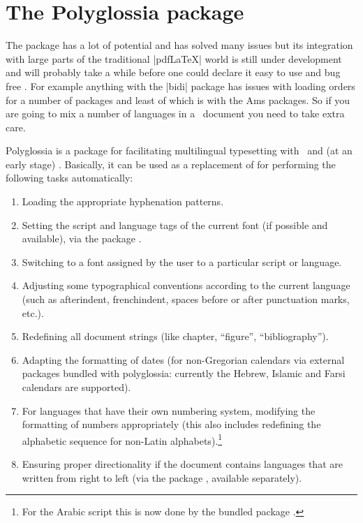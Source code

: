 

\section{The Polyglossia package}

The  package has a lot of potential and has solved many issues
but its integration with large parts of the traditional |pdfLaTeX| world
is still under development and will probably take a while before one could
declare it easy to use and bug free . For example anything with the |bidi| package has issues with loading orders for a number of packages and least of which is with
the Ams packages. So if you are going to mix a number of languages in a \XeTeX\ document
you need to take extra care.

 Polyglossia is a package for facilitating multilingual typesetting with
 \XeLaTeX\ and (at an early stage) \LuaLaTeX.  Basically, it
 can be used as a replacement of  for performing the following
 tasks automatically:
 
 \begin{enumerate}
 \item Loading the appropriate hyphenation patterns.
 \item Setting the script and language tags of the current font (if possible and
       available), via the package .
 \item Switching to a font assigned by the user to a particular script or language.
 \item Adjusting some typographical conventions according to the current language
       (such as afterindent, frenchindent, spaces before or after punctuation marks,
       etc.).
 \item Redefining all document strings (like chapter, ``figure'', ``bibliography'').
 \item Adapting the formatting of dates (for non-Gregorian calendars via external
       packages bundled with polyglossia: currently the Hebrew, Islamic and Farsi
       calendars are supported).
 \item For languages that have their own numbering system, modifying the formatting
       of numbers appropriately (this also includes redefining the alphabetic sequence
       for non-Latin alphabets).\footnote{ %
         For the Arabic script this is now done by the bundled package .}
 \item Ensuring proper directionality if the document contains languages
       that are written from right to left (via the package ,
       available separately).
 \end{enumerate}
 
